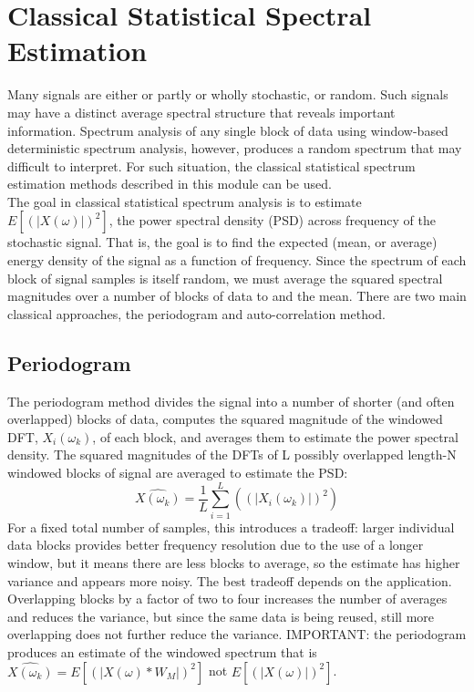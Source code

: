 \documentclass[10pt,english]{article}
\begin{document}
\section{Classical Statistical Spectral Estimation}
Many signals are either or partly or wholly stochastic, or random. Such signals may have a distinct average spectral structure that reveals important information. Spectrum analysis of any single block of data using window-based deterministic spectrum analysis, however, produces a random spectrum that may difficult to interpret. For such situation, the classical statistical spectrum estimation methods described in this module can be used.\\
The goal in classical statistical spectrum analysis is to estimate $E\left[ \left( \left| X(\omega) \right|  \right)^2 \right]$, the power spectral density (PSD) across frequency of the stochastic signal. That is, the goal is to find the expected (mean, or average) energy density of the signal as a function of frequency. Since the spectrum of each block of signal samples is itself random, we must average the squared spectral magnitudes over a number of blocks of data to and the mean. There are two main classical approaches, the periodogram and auto-correlation method.

\subsection{Periodogram}
The periodogram method divides the signal into a number of shorter (and often overlapped) blocks of data, computes the squared magnitude of the windowed  DFT, $X_i ( \omega_k)$, of each block, and averages them to estimate the power spectral density. The squared magnitudes of the DFTs of L possibly overlapped length-N windowed blocks of signal are averaged to estimate the PSD:
\begin{equation}
\hat{X (\omega_k)} = \frac{1}{L} \sum_{i = 1}^{L} \left(  \left(\left| X_i(\omega_k) \right| \right)^2    \right)
\end{equation}
For a fixed total number of samples, this introduces a tradeoff: larger individual data blocks provides better frequency resolution due to the use of a longer window, but it means there are less blocks to average, so the estimate has higher variance and appears more noisy. The best tradeoff depends on the application. Overlapping blocks by a factor of two to four increases the number of averages and reduces the variance, but since the same data is being reused, still more overlapping does not further reduce the variance. IMPORTANT: the periodogram produces an estimate of the windowed spectrum that is $\hat{X (\omega_k)} = E \left[ \left( \left| X(\omega) * W_M \right|  \right)^2 \right]$ not $E \left[ \left( \left| X(\omega)\right|  \right)^2 \right]$.
\end{document}

